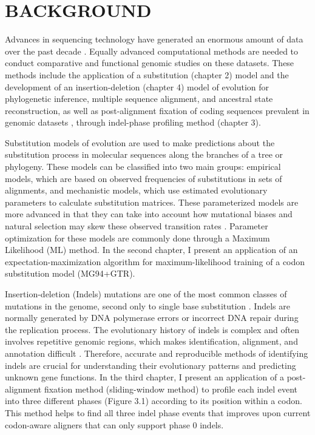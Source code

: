 \chapter{\normalfont BACKGROUND}
Advances in sequencing technology have generated an enormous amount of data over the past decade \parencite{van2014ten}. Equally advanced computational methods are needed to conduct comparative and functional genomic studies on these datasets. These methods include the application of a substitution (chapter 2) model and the development of an insertion-deletion (chapter 4) model of evolution for phylogenetic inference, multiple sequence alignment, and ancestral state reconstruction, as well as post-alignment fixation of coding sequences prevalent in genomic datasets \parencite{ranwez2011macse}, through indel-phase profiling method (chapter 3).  

Substitution models of evolution are used to make predictions about the substitution process in molecular sequences along the branches of a tree or phylogeny. These models can be classified into two main groups: empirical models, which are based on observed frequencies of substitutions in sets of alignments, and mechanistic models, which use estimated evolutionary parameters to calculate substitution matrices. These parameterized models are more advanced in that they can take into account how mutational biases and natural selection may skew these observed transition rates \parencite{yang2008mutation}. Parameter optimization for these models are commonly done through a Maximum Likelihood (ML) method. In the second chapter, I present an application of an expectation-maximization algorithm for maximum-likelihood training of a codon substitution model (MG94+GTR). 

Insertion-deletion (Indels) mutations are one of the most common classes of mutations in the genome, second only to single base substitution \parencite{taylor2004occurrence}. Indels are normally generated by DNA polymerase errors or incorrect DNA repair during the replication process. The evolutionary history of indels is complex and often involves repetitive genomic regions, which makes identification, alignment, and annotation difficult \parencite{kunkel2004dna}. Therefore, accurate and reproducible methods of identifying indels are crucial for understanding their evolutionary patterns and predicting unknown gene functions. In the third chapter, I present an application of a post-alignment fixation method (sliding-window method) to profile each indel event into three different phases (Figure 3.1) according to its position within a codon. This method helps to find all three indel phase events that improves upon current codon-aware aligners that can only support phase 0 indels. 

